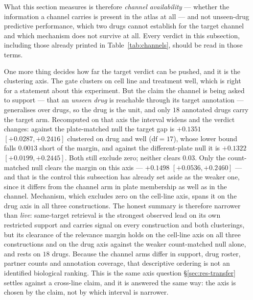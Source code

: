 What this section measures is therefore
\emph{channel availability} --- whether the information a channel carries is present in the atlas at
all --- and not unseen-drug predictive performance, which two drugs cannot establish for the target
channel and which mechanism does not survive at all. Every verdict in this subsection, including
those already printed in Table~\ref{tab:channels}, should be read in those terms.

One more thing decides how far the target verdict can be pushed, and it is the clustering axis.
The gate clusters on cell line and treatment well, which is right for a statement about this
experiment. But the claim the channel is being asked to support --- that an \emph{unseen drug} is
reachable through its target annotation --- generalises over drugs, so the drug is the unit, and
only $18$ annotated drugs carry the target arm. Recomputed on that axis the interval widens and the
verdict changes: against the plate-matched null the target gap is
$+0.1351$ \nolinebreak[3]$[+0.0287, +0.2416]$ clustered on drug and well ($\mathrm{df} = 17$),
whose lower bound falls $0.0013$ short of the margin, and against the different-plate null it is
$+0.1322$ \nolinebreak[3]$[+0.0199, +0.2445]$. Both still exclude zero; neither clears $0.03$.
Only the count-matched null clears the margin on this axis ---
$+0.1498$ \nolinebreak[3]$[+0.0536, +0.2460]$ --- and that is the control this subsection has
already set aside as the weaker one, since it differs from the channel arm in plate membership as
well as in the channel.
Mechanism, which excludes zero on the cell-line axis, spans it on the drug axis in all three
constructions. The honest summary is therefore narrower than \emph{live}: same-target retrieval is
the strongest observed lead on its own restricted support and carries signal on every construction
and both clusterings, but its clearance of the relevance margin holds on the cell-line axis on all three
constructions and on the drug axis against the weaker count-matched null alone, and rests on $18$
drugs. Because the channel arms differ in support, drug roster, partner counts and annotation
coverage, that descriptive ordering is not an identified biological ranking. This is the same axis question \S\ref{sec:res-transfer} settles
against a cross-line claim, and it is answered the same way: the axis is chosen by the claim, not by
which interval is narrower.

